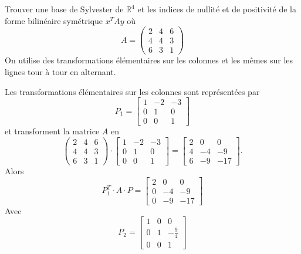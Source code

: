 \begin{example}
  \label{exe:11}
  Trouver une base de Sylvester de $ℝ^4$ et les indices de nullité et de positivité de la forme bilinéaire symétrique $x^TAy$ où  
  \begin{displaymath}
A = 
    \begin{pmatrix}
      2 & 4 & 6 \\
      4 & 4 & 3 \\
      6 & 3 & 1 
    \end{pmatrix}
  \end{displaymath}
On utilise des transformations élémentaires sur les colonnes et les mêmes sur les lignes tour à tour en alternant. 

\noindent Les transformations élémentaires sur les colonnes sont représentées par 
\begin{displaymath}
P_1 = 
  \left[\begin{matrix}1 & -2 & -3\\0 & 1 & 0\\0 & 0 & 1\end{matrix}\right]
\end{displaymath}
et transforment la matrice $A$ en 
\begin{displaymath}
   \begin{pmatrix}
      2 & 4 & 6 \\
      4 & 4 & 3 \\
      6 & 3 & 1 
    \end{pmatrix} \cdot  \left[\begin{matrix}1 & -2 & -3\\0 & 1 & 0\\0 & 0 & 1\end{matrix}\right] = \left[\begin{matrix}2 & 0 & 0\\4 & -4 & -9\\6 & -9 & -17\end{matrix}\right]. 
\end{displaymath}
Alors 
\begin{displaymath}
  P_1^T\cdot A \cdot P = \left[\begin{matrix}2 & 0 & 0\\0 & -4 & -9\\0 & -9 & -17\end{matrix}\right]
\end{displaymath}
Avec 
\begin{displaymath}
  P_2 = \left[\begin{matrix}1 & 0 & 0\\0 & 1 & -\frac{9}{4}\\0 & 0 &1\end{matrix}\right]

\end{displaymath}
\end{example}
